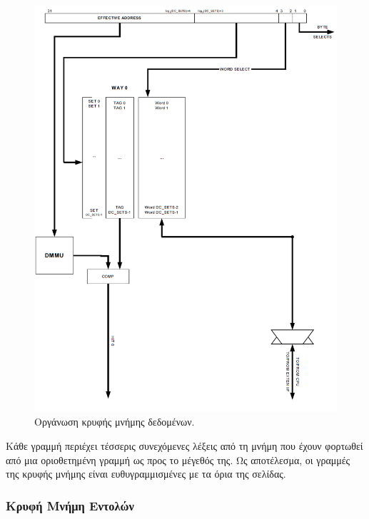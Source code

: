 \documentclass[a4paper,10pt]{article}
\numberwithin{figure}{section}
\numberwithin{table}{section}
\begin{document}
\vspace{0.7cm}
\begin{figure}[h!]
 \centering
 \includegraphics[bb=0 0 906 1228,scale=0.38]{./Images/data_cache.png}
 \caption{Οργάνωση κρυφής μνήμης δεδομένων.}
\end{figure}
\vspace{0.7cm}

Κάθε γραμμή περιέχει τέσσερις συνεχόμενες λέξεις από τη μνήμη που έχουν φορτωθεί από μια 
οριοθετημένη γραμμή ως προς το μέγεθός της. Ως αποτέλεσμα, οι γραμμές της κρυφής μνήμης 
είναι ευθυγραμμισμένες με τα όρια της σελίδας.

\subsubsection{Κρυφή Μνήμη Εντολών}
\end{document}
